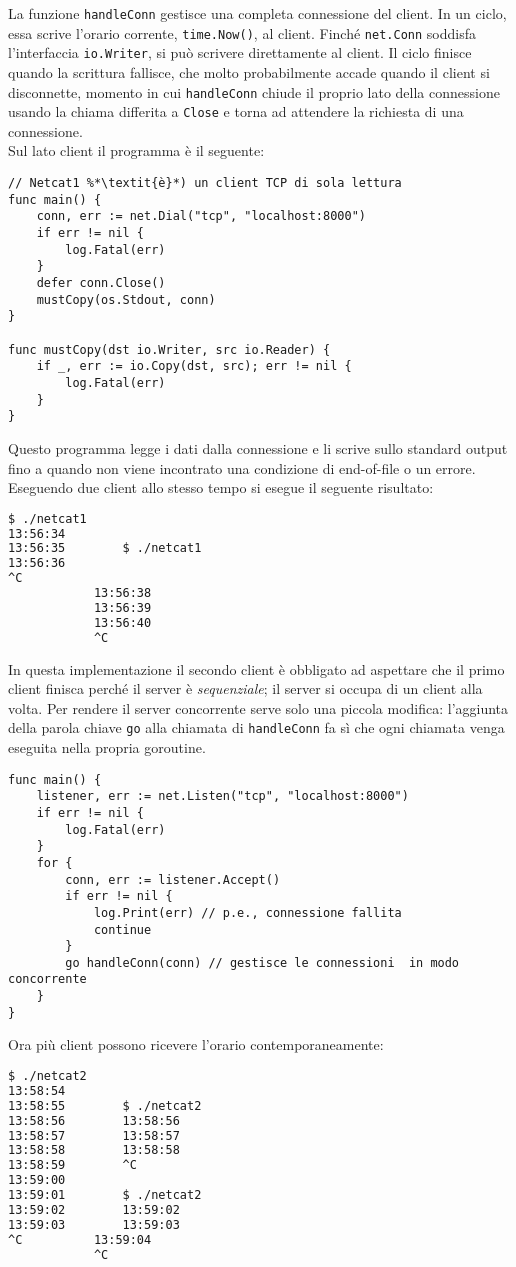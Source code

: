 \documentclass[../../thesis.tex]{subfiles}
\begin{document}
    La funzione \verb"handleConn" gestisce una completa connessione del client.
    In un ciclo, essa scrive l'orario corrente, \verb"time.Now()", al client.
    Finché \verb"net.Conn" soddisfa l'interfaccia \verb"io.Writer", si può scrivere direttamente al client.
    Il ciclo finisce quando la scrittura fallisce, che molto probabilmente accade quando il client si disconnette, momento in cui \verb"handleConn" chiude il proprio lato della connessione usando la chiama differita a \verb"Close" e torna ad attendere la richiesta di una connessione. \\
    Sul lato client il programma è il seguente:
    \begin{lstlisting}[frame = single,label={lst:lstlisting7-2.2}]
// Netcat1 %*\textit{è}*) un client TCP di sola lettura
func main() {
    conn, err := net.Dial("tcp", "localhost:8000")
    if err != nil {
        log.Fatal(err)
    }
    defer conn.Close()
    mustCopy(os.Stdout, conn)
}

func mustCopy(dst io.Writer, src io.Reader) {
    if _, err := io.Copy(dst, src); err != nil {
        log.Fatal(err)
    }
}
    \end{lstlisting}
    Questo programma legge i dati dalla connessione e li scrive sullo standard output fino a quando non viene incontrato una condizione di end-of-file o un errore.
    Eseguendo due client allo stesso tempo si esegue il seguente risultato:
    \begin{lstlisting}[language = bash, frame = L,label={lst:lstlisting7-2.3}]
$ ./netcat1
13:56:34
13:56:35		$ ./netcat1
13:56:36
^C
			13:56:38
			13:56:39
			13:56:40
			^C
    \end{lstlisting}
    In questa implementazione il secondo client è obbligato ad aspettare che il primo client finisca perché il server è \textit{sequenziale}; il server si occupa di un client alla volta.
    Per rendere il server concorrente serve solo una piccola modifica: l'aggiunta della parola chiave \verb"go" alla chiamata di \verb"handleConn" fa sì che ogni chiamata venga eseguita nella propria goroutine.
    \begin{lstlisting}[frame = single,label={lst:lstlisting7-2.4}]
func main() {
    listener, err := net.Listen("tcp", "localhost:8000")
    if err != nil {
        log.Fatal(err)
    }
    for {
        conn, err := listener.Accept()
        if err != nil {
            log.Print(err) // p.e., connessione fallita
            continue
        }
        go handleConn(conn) // gestisce le connessioni  in modo concorrente
    }
}
    \end{lstlisting}
    Ora più client possono ricevere l'orario contemporaneamente:
    \begin{lstlisting}[language = bash, frame = L,label={lst:lstlisting7-2.5}]
$ ./netcat2
13:58:54
13:58:55		$ ./netcat2
13:58:56		13:58:56
13:58:57		13:58:57
13:58:58		13:58:58
13:58:59		^C
13:59:00
13:59:01		$ ./netcat2
13:59:02		13:59:02
13:59:03		13:59:03
^C			13:59:04
			^C
    \end{lstlisting}
\end{document}
